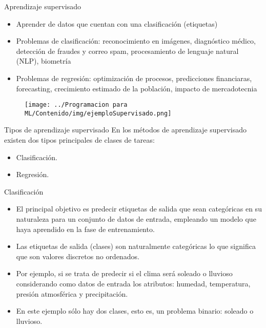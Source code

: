 \documentclass[11pt,aspectratio=169]{beamer}
\begin{document}
\begin{frame}{Aprendizaje supervisado}
\begin{itemize}
	\item Aprender de datos que cuentan con una clasificación (etiquetas)\pause
	\item Problemas de clasificación: reconocimiento en imágenes, diagnóstico médico, detección de fraudes y correo spam, procesamiento de 
		lenguaje natural (NLP), biometría\pause
	\item Problemas de regresión: optimización de procesos, predicciones financiaras, forecasting, crecimiento estimado de la población, 
		impacto de mercadotecnia\pause
\end{itemize}

\begin{figure}[H]
	\centering
	\texttt{[image: ../Programacion para ML/Contenido/img/ejemploSupervisado.png]}
\end{figure}
\end{frame}

\begin{frame}{Tipos de aprendizaje supervisado}
En los métodos de aprendizaje supervisado existen dos tipos principales de clases de tareas: \pause
\begin{itemize}
	\item Clasificación.\pause
	\item Regresión.
\end{itemize}
\end{frame}

\begin{frame}{Clasificación}
\begin{itemize}
	\item El principal objetivo es predecir etiquetas de salida que sean categóricas en su naturaleza para un conjunto de datos de entrada,
		empleando un modelo que haya aprendido en la fase de entrenamiento.\pause
	\item Las etiquetas de salida (clases) son naturalmente categóricas lo que significa que son valores discretos no ordenados. \pause
	\item Por ejemplo, si se trata de predecir si el clima será soleado o lluvioso considerando como datos de entrada los atributos: humedad, temperatura, presión
		atmosférica y precipitación.\pause
	\item En este ejemplo sólo hay dos clases, esto es, un problema binario: soleado o lluvioso.
\end{itemize}		
\end{frame}
\end{document}
